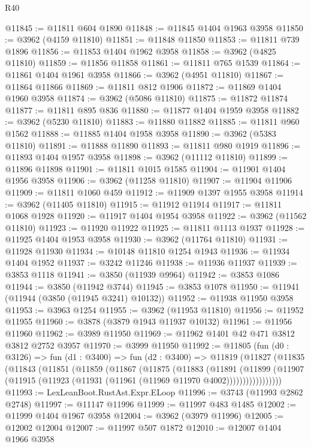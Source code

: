 \begin{lexlean}{R40}
\begin{coremodule}
@11845 := @11811 @604 @1890
@11848 := @11845 @1404 @1963 @3958
@11850 := @3962 (@4159 @11810)
@11851 := @11848 @11850
@11853 := @11811 @739 @1896
@11856 := @11853 @1404 @1962 @3958
@11858 := @3962 (@4825 @11810)
@11859 := @11856 @11858
@11861 := @11811 @765 @1539
@11864 := @11861 @1404 @1961 @3958
@11866 := @3962 (@4951 @11810)
@11867 := @11864 @11866
@11869 := @11811 @812 @1906
@11872 := @11869 @1404 @1960 @3958
@11874 := @3962 (@5086 @11810)
@11875 := @11872 @11874
@11877 := @11811 @895 @836
@11880 := @11877 @1404 @1959 @3958
@11882 := @3962 (@5230 @11810)
@11883 := @11880 @11882
@11885 := @11811 @960 @1562
@11888 := @11885 @1404 @1958 @3958
@11890 := @3962 (@5383 @11810)
@11891 := @11888 @11890
@11893 := @11811 @980 @1919
@11896 := @11893 @1404 @1957 @3958
@11898 := @3962 (@11112 @11810)
@11899 := @11896 @11898
@11901 := @11811 @1015 @1585
@11904 := @11901 @1404 @1956 @3958
@11906 := @3962 (@11258 @11810)
@11907 := @11904 @11906
@11909 := @11811 @1060 @459
@11912 := @11909 @1397 @1955 @3958
@11914 := @3962 (@11405 @11810)
@11915 := @11912 @11914
@11917 := @11811 @1068 @1928
@11920 := @11917 @1404 @1954 @3958
@11922 := @3962 (@11562 @11810)
@11923 := @11920 @11922
@11925 := @11811 @1113 @1937
@11928 := @11925 @1404 @1953 @3958
@11930 := @3962 (@11764 @11810)
@11931 := @11928 @11930
@11934 := @10148 @11810 @1254 @1943
@11936 := @11934 @1404 @1952
@11937 := @3242 @11246
@11938 := @11936 @11937
@11939 := @3853 @1118
@11941 := @3850 (@11939 @9964)
@11942 := @3853 @1086
@11944 := @3850 (@11942 @3744)
@11945 := @3853 @1078
@11950 := @11941 (@11944 (@3850 (@11945 @3241) @10132))
@11952 := @11938 @11950 @3958
@11953 := @3963 @1254
@11955 := @3962 (@11953 @11810)
@11956 := @11952 @11955
@11960 := @3878 (@3879 @1943 @11937 @10132)
@11961 := @11956 @11960
@11962 := @3989 @11950
@11969 := @11962 @1401 @42 @471 @3812 @3812 @2752 @3957
@11970 := @3999 @11950
@11992 := @11805
    (fun (d0 : @3126) =>
    fun (d1 : @3400) =>
    fun (d2 : @3400) =>
    @11819
      (@11827
        (@11835
          (@11843
            (@11851
              (@11859
                (@11867
                  (@11875
                    (@11883
                      (@11891
                        (@11899
                          (@11907
                            (@11915 (@11923 (@11931 (@11961 (@11969 @11970 @4002)))))))))))))))))
@11993 := LexLeanBoot.RustAst.Expr.ELoop
@11996 := @3743 (@11993 @2862 @2748)
@11997 := @11147 @11996
@11999 := @11997 @483 @1485
@12002 := @11999 @1404 @1967 @3958
@12004 := @3962 (@3979 @11996)
@12005 := @12002 @12004
@12007 := @11997 @507 @1872
@12010 := @12007 @1404 @1966 @3958

\end{coremodule}
\end{lexlean}
